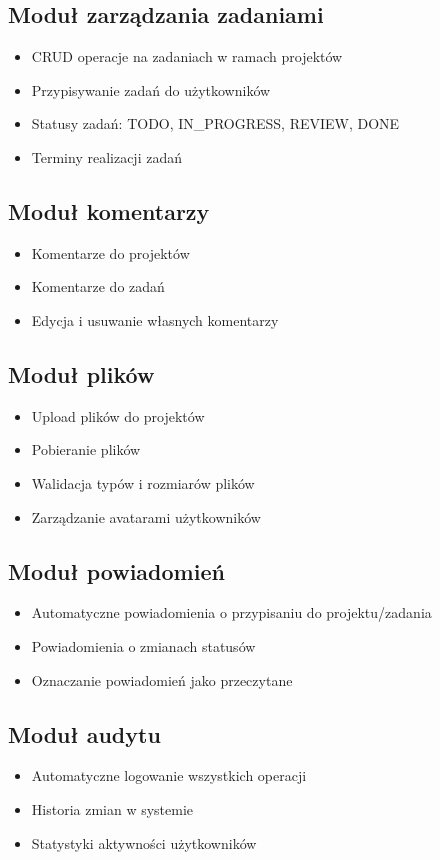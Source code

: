 \documentclass[12pt,a4paper]{report}
\begin{document}
\subsection{Moduł zarządzania zadaniami}
\begin{itemize}
    \item CRUD operacje na zadaniach w ramach projektów
    \item Przypisywanie zadań do użytkowników
    \item Statusy zadań: TODO, IN\_PROGRESS, REVIEW, DONE
    \item Terminy realizacji zadań
\end{itemize}

\subsection{Moduł komentarzy}
\begin{itemize}
    \item Komentarze do projektów
    \item Komentarze do zadań
    \item Edycja i usuwanie własnych komentarzy
\end{itemize}

\subsection{Moduł plików}
\begin{itemize}
    \item Upload plików do projektów
    \item Pobieranie plików
    \item Walidacja typów i rozmiarów plików
    \item Zarządzanie avatarami użytkowników
\end{itemize}

\subsection{Moduł powiadomień}
\begin{itemize}
    \item Automatyczne powiadomienia o przypisaniu do projektu/zadania
    \item Powiadomienia o zmianach statusów
    \item Oznaczanie powiadomień jako przeczytane
\end{itemize}

\subsection{Moduł audytu}
\begin{itemize}
    \item Automatyczne logowanie wszystkich operacji
    \item Historia zmian w systemie
    \item Statystyki aktywności użytkowników
\end{itemize}
\end{document}
